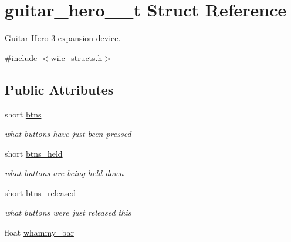 \hypertarget{structguitar__hero__3__t}{\section{guitar\-\_\-hero\-\_\-\_\-t \-Struct \-Reference}
\label{structguitar__hero__3__t}
}


\-Guitar \-Hero 3 expansion device.  




{\ttfamily \#include $<$wiic\-\_\-structs.\-h$>$}

\subsection*{\-Public \-Attributes}
\begin{DoxyCompactItemize}
\item 
\hypertarget{structguitar__hero__3__t_a65e19f650d5ce8298707eb63707abd7f}{short \hyperlink{structguitar__hero__3__t_a65e19f650d5ce8298707eb63707abd7f}{btns}}\label{structguitar__hero__3__t_a65e19f650d5ce8298707eb63707abd7f}

\begin{DoxyCompactList}\small\item\em what buttons have just been pressed \end{DoxyCompactList}\item 
\hypertarget{structguitar__hero__3__t_ab738e83c9952dec3145e60a4b97727ce}{short \hyperlink{structguitar__hero__3__t_ab738e83c9952dec3145e60a4b97727ce}{btns\-\_\-held}}\label{structguitar__hero__3__t_ab738e83c9952dec3145e60a4b97727ce}

\begin{DoxyCompactList}\small\item\em what buttons are being held down \end{DoxyCompactList}\item 
\hypertarget{structguitar__hero__3__t_aefddbb47a726fff6b5e124f3f0008716}{short \hyperlink{structguitar__hero__3__t_aefddbb47a726fff6b5e124f3f0008716}{btns\-\_\-released}}\label{structguitar__hero__3__t_aefddbb47a726fff6b5e124f3f0008716}

\begin{DoxyCompactList}\small\item\em what buttons were just released this \end{DoxyCompactList}\item 
\hypertarget{structguitar__hero__3__t_a600aeec0929ee91d57d4685d79876942}{float \hyperlink{structguitar__hero__3__t_a600aeec0929ee91d57d4685d79876942}{whammy\-\_\-bar}}\label{structguitar__hero__3__t_a600aeec0929ee91d57d4685d79876942}


\end{DoxyCompactItemize}
